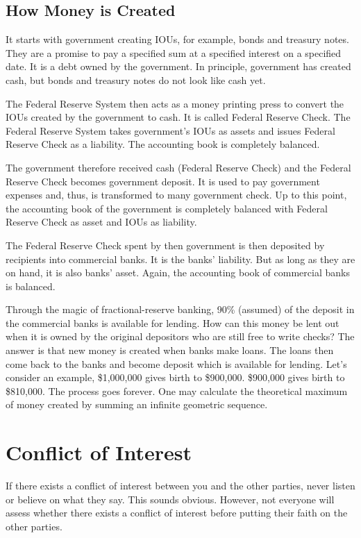 \documentclass[a4paper]{report}
\begin{document}
\section{How Money is Created}
It starts with government creating IOUs, for example, bonds and treasury notes. They are a promise to pay a specified sum at a specified interest on a specified date. It is a debt owned by the government. In principle, government has created cash, but bonds and treasury notes do not look like cash yet.

The Federal Reserve System then acts as a money printing press to convert the IOUs created by the government to cash. It is called Federal Reserve Check. The Federal Reserve System takes government's IOUs as assets and issues Federal Reserve Check as a liability. The accounting book is completely balanced.

The government therefore received cash (Federal Reserve Check) and the Federal Reserve Check becomes government deposit. It is used to pay government expenses and, thus, is transformed to many government check. Up to this point, the accounting book of the government is completely balanced with Federal Reserve Check as asset and IOUs as liability.

The Federal Reserve Check spent by then government is then deposited by recipients into commercial banks. It is the banks' liability. But as long as they are on hand, it is also banks' asset. Again, the accounting book of commercial banks is balanced.

Through the magic of fractional-reserve banking, 90\% (assumed) of the deposit in the commercial banks is available for lending. How can this money be lent out when it is owned by the original depositors who are still free to write checks? The answer is that new money is created when banks make loans. The loans then come back to the banks and become deposit which is available for lending. Let's consider an example, \$1,000,000 gives birth to \$900,000. \$900,000 gives birth to \$810,000. The process goes forever. One may calculate the theoretical maximum of money created by summing an infinite geometric sequence.

\chapter{Conflict of Interest}
If there exists a conflict of interest between you and the other parties, never listen or believe on what they say. This sounds obvious. However, not everyone will assess whether there exists a conflict of interest before putting their faith on the other parties.
\end{document}
